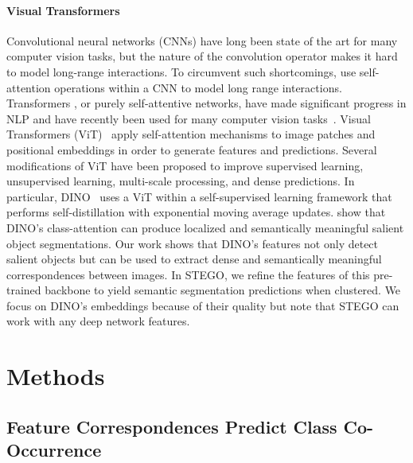 \documentclass{article} \usepackage{iclr2022_conference,times}
\begin{document}
\paragraph{Visual Transformers}
Convolutional neural networks (CNNs) have long been state of the art for many computer vision tasks, but the nature of the convolution operator makes it hard to model long-range interactions. To circumvent such shortcomings, \cite{wang2018non, zhang2019self} use self-attention operations within a CNN to model long range interactions. Transformers \citep{vaswani2017attention}, or purely self-attentive networks, have made significant progress in NLP and have recently been used for many computer vision tasks~\citep{dosovitskiy2020image, touvron2021training, Ranftl2021, dino}.
Visual Transformers (ViT)~\citep{vaswani2017attention} apply self-attention mechanisms to image patches and positional embeddings in order to generate features and predictions. Several modifications of ViT have been proposed to improve supervised learning, unsupervised learning, multi-scale processing, and dense predictions. In particular, DINO~\citep{dino} uses a ViT within a self-supervised learning framework that performs self-distillation with exponential moving average updates. \cite{dino} show that DINO's class-attention can produce localized and semantically meaningful salient object segmentations. Our work shows that DINO's features not only detect salient objects but can be used to extract dense and semantically meaningful correspondences between images. In STEGO, we refine the features of this pre-trained backbone to yield semantic segmentation predictions when clustered. We focus on DINO's embeddings because of their quality but note that STEGO can work with any deep network features.

\section{Methods}

\subsection{Feature Correspondences Predict Class Co-Occurrence}
\label{sec:correspondence}
\end{document}
